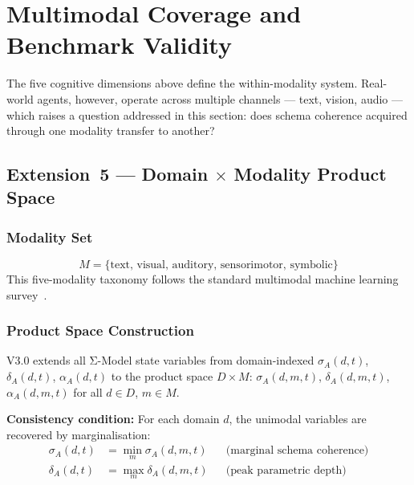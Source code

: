 \documentclass[11pt]{article}
\theoremstyle{definition}
\theoremstyle{plain}
\begin{document}
\section{Multimodal Coverage and Benchmark Validity}\label{sec:multimodal}

The five cognitive dimensions above define the within-modality system.
Real-world agents, however, operate across multiple channels --- text,
vision, audio --- which raises a question addressed in this section:
does schema coherence acquired through one modality transfer to another?

\subsection{Extension~5 --- Domain \texorpdfstring{$\times$}{x} Modality Product Space}\label{sec:product-space}

\subsubsection{Modality Set}
\begin{equation}\label{eq:modalities}
M = \{\text{text, visual, auditory, sensorimotor, symbolic}\}
\end{equation}
This five-modality taxonomy follows the standard multimodal machine learning survey~\citep{baltrušaitis2018multimodal}.
 
\subsubsection{Product Space Construction}

V3.0 extends all Σ-Model state variables from domain-indexed
$\sigma_A(d, t)$, $\delta_A(d, t)$, $\alpha_A(d, t)$ to the product space $D \times M$:
$\sigma_A(d, m, t)$, $\delta_A(d, m, t)$, $\alpha_A(d, m, t)$ for all $d \in D$, $m \in M$.

\textbf{Consistency condition:} For each domain $d$, the unimodal variables
are recovered by marginalisation:
\begin{align}
\sigma_A(d, t) &= \min_m \sigma_A(d, m, t) & &\text{(marginal schema coherence)} \label{eq:marginal-sigma} \\
\delta_A(d, t) &= \max_m \delta_A(d, m, t) & &\text{(peak parametric depth)} \label{eq:marginal-delta}
\end{align}
\end{document}
